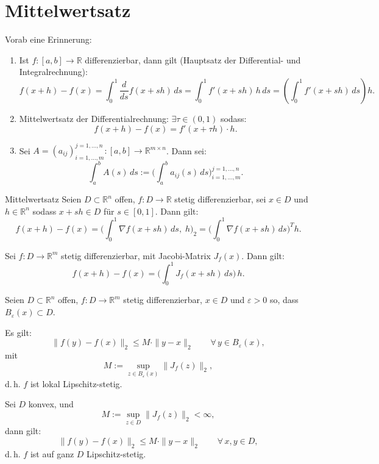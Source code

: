 \newpage
\section{Mittelwertsatz}
\label{4.3}

\begin{bemerkungbox}
    Vorab eine Erinnerung:
    \begin{enumerate}
        \item[(1)] Ist $f:[a,b]\to\mathbb{R}$ differenzierbar, dann gilt (Hauptsatz der Differential- und Integralrechnung):
            $$
            f(x+h)-f(x)=\int_0^1 \frac{d}{ds}f(x+sh)\,ds
            = \int_0^1 f'(x+sh)\,h \,ds
            = \left(\int_0^1 f'(x+sh)\,ds\right)\! h.
            $$
         
        \item[(2)] Mittelwertsatz der Differentialrechnung: $\exists \tau\in(0,1)$ sodass:
            $$
            f(x+h)-f(x)=f'(x+\tau h)\cdot h.
            $$

        \item[(3)] Sei $A=(a_{ij})_{i=1,\dots,m}^{j=1,\dots,n}:[a,b]\to\mathbb{R}^{m\times n}$. Dann sei:
            $$
            \int_a^b A(s)\,ds := \bigg(\int_a^b a_{ij}(s)\,ds\bigg)_{i=1,\dots,m}^{j=1,\dots,n}.
            $$
    \end{enumerate}
\end{bemerkungbox}

\begin{satz}{Mittelwertsatz}
    Seien $D\subset\mathbb{R}^n$ offen, $f:D\to\mathbb{R}$ stetig differenzierbar, sei $x\in D$ und $h\in\mathbb{R}^n$ sodass $x+sh\in D$ für $s\in[0,1]$. Dann gilt:
    $$
    f(x+h)-f(x)
    = \Big(\int_0^1 \nabla f(x+sh)\,ds,\; h\Big)_2
    = \Big(\int_0^1 \nabla f(x+sh)\,ds\Big)^{\!T} h.
    $$
    
    Sei $f:D\to\mathbb{R}^m$ stetig differenzierbar, mit Jacobi-Matrix $J_f(x)$. Dann gilt:
    $$
    f(x+h)-f(x) = \Big(\int_0^1 J_f(x+sh)\,ds\Big)\, h.
    $$
\end{satz}

\begin{korollar}{}
    Seien $D\subset\mathbb{R}^n$ offen, $f: D \to \mathbb{R}^m$ stetig differenzierbar, $x\in D$ und $\varepsilon>0$ so, dass $B_{\varepsilon}(x)\subset D$.

    Es gilt:
    $$
    \|f(y)-f(x)\|_2 \le M\cdot\|y-x\|_2 \qquad \forall\, y\in B_{\varepsilon}(x),
    $$
    mit
    $$
    M := \sup_{z\in B_{\varepsilon}(x)} \|J_f(z)\|_2,
    $$
    d.\,h. $f$ ist lokal Lipschitz-stetig.

    Sei $D$ konvex, und
    $$
    M := \sup_{z\in D} \|J_f(z)\|_2 < \infty,
    $$
    dann gilt:
    $$
    \|f(y)-f(x)\|_2 \le M\cdot\|y-x\|_2 \qquad \forall\, x,y\in D,
    $$
    d.\,h. $f$ ist auf ganz $D$ Lipschitz-stetig.
\end{korollar}

